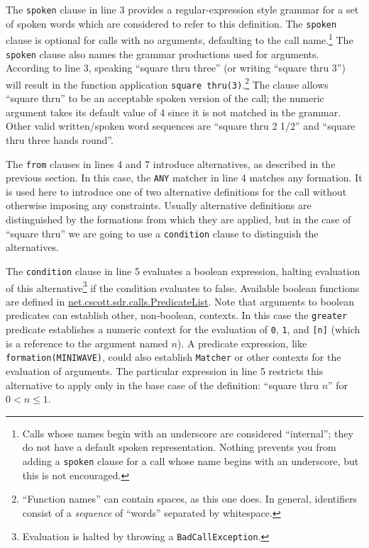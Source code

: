 \documentclass[12pt]{article}
\newcommand{\clause}[1]{\texttt{#1}}
\renewcommand{\call}[1]{\texttt{#1}} %
\newcommand{\package}[1]{\url{#1}}
\begin{document}
The \clause{spoken} clause in line 3 provides a regular-expression
style grammar for a set of spoken words which are considered to refer
to this definition.  The \clause{spoken} clause is optional for calls
with no arguments, defaulting to the call name.\footnote{Calls whose
  names begin with an underscore are considered ``internal''; they do
  not have a default spoken representation.  Nothing prevents you from
  adding a \clause{spoken} clause for a call whose name begins with an
  underscore, but this is not encouraged.}  The \clause{spoken} clause
also names the grammar productions used for arguments.  According to
line 3, speaking ``square thru three'' (or writing ``square thru 3'')
will result in the function application \texttt{square
  thru(3)}.\footnote{``Function names'' can contain spaces, as this
  one does.  In general, identifiers consist of a \textit{sequence} of
  ``words'' separated by whitespace.}  The clause allows ``square
thru'' to be an acceptable spoken version of the call; the numeric
argument takes its default value of 4 since it is not matched in the
grammar.  Other valid written/spoken word sequences are ``square thru 2 1/2''
and ``square thru three hands round''.

The \clause{from} clauses in lines 4 and 7 introduce alternatives, as
described in the previous section.  In this case, the \texttt{ANY}
matcher in line 4 matches any formation.  It is used here to introduce
one of two alternative definitions for the call without otherwise
imposing any constraints.  Usually alternative definitions are
distinguished by the formations from which they are applied, but in
the case of ``square thru'' we are going to use a \clause{condition}
clause to distinguish the alternatives.

The \clause{condition} clause in line 5 evaluates a boolean
expression, halting evaluation of this alternative\footnote{Evaluation
  is halted by throwing a \texttt{BadCallException}.} if the condition
evaluates to false.  Available boolean functions are defined in
\package{net.cscott.sdr.calls.PredicateList}.  Note that arguments to
boolean predicates can establish other, non-boolean, contexts.  In
this case the \call{greater} predicate establishes a numeric context
for the evaluation of \texttt{0}, \texttt{1}, and \texttt{[n]} (which
is a reference to the argument named $n$).  A predicate expression,
like \texttt{formation(MINIWAVE)}, could also establish
\texttt{Matcher} or other contexts for the evaluation of arguments.
The particular expression in line 5 restricts this alternative to
apply only in the base case of the definition: ``square thru $n$'' for
$0 < n \leq 1$.
\end{document}
